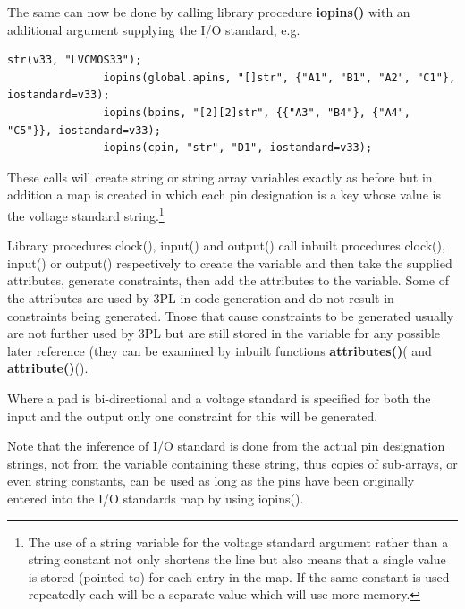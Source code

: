             The same can now be done by calling library procedure
            {\bf iopins()}  with an additional argument
            supplying the I/O standard, e.g.
            \begin{lstlisting}[gobble=12, language=threepl]
               str(v33, "LVCMOS33");
               iopins(global.apins, "[]str", {"A1", "B1", "A2", "C1"}, iostandard=v33);
               iopins(bpins, "[2][2]str", {{"A3", "B4"}, {"A4", "C5"}}, iostandard=v33);
               iopins(cpin, "str", "D1", iostandard=v33);
            \end{lstlisting}
            These calls will create string or string array variables exactly as
            before but in addition a map is created in which each pin
            designation is a key whose value is the voltage standard
            string.\footnote{The use of a string variable for the voltage
            standard argument rather than a string constant not only shortens
            the line but also means that a single value is stored (pointed to)
            for each entry in the map. If the same constant is used repeatedly
            each will be a separate value which will use more memory.}

            Library procedures clock(), input() and output() call inbuilt
            procedures clock(), input() or output() respectively to create the
            variable and then take the supplied attributes, generate constraints,
            then add the attributes to the variable. Some of the attributes are
            used by 3PL in code generation and do not result in constraints being
            generated. Tnose that cause constraints to be generated usually are
            not further used by 3PL but are still stored in the variable for any
            possible later reference (they can be examined by inbuilt functions
            {\bf attributes()}( and {\bf
            attribute()}().
            
            Where a pad is bi-directional and a voltage standard is specified
            for both the input and the output only one constraint for this will
            be generated.

            Note that the inference of I/O standard is done from the actual pin
            designation strings, not from the variable containing these string,
            thus copies of sub-arrays, or even string constants, can be used as
            long as the pins have been originally entered into the I/O standards
            map by using iopins().


